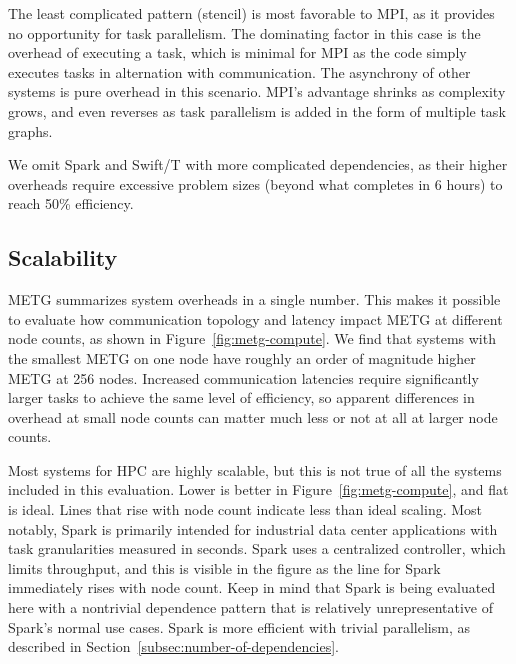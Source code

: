 The least complicated pattern (stencil) is most favorable
to MPI, as it provides no
opportunity for task parallelism. The
dominating factor in this case is the overhead of executing a task, which is
minimal for MPI as the code simply executes tasks in alternation with
communication. The asynchrony
of other systems is pure overhead in this scenario.
MPI's advantage shrinks as complexity grows, and even reverses as task parallelism is
added in the form of multiple task graphs.

We omit Spark and Swift/T
with more complicated dependencies, as their higher overheads require
excessive problem sizes (beyond what completes in 6
hours) to reach 50\% efficiency.

\subsection{Scalability}
\label{subsec:scalability}

METG summarizes system overheads in a single number. This makes it possible to
evaluate how communication topology and latency impact METG at
different node counts, as shown in Figure~\ref{fig:metg-compute}.
We find that
systems with the smallest METG on one node have roughly an order
of magnitude higher METG at 256 nodes. Increased communication latencies require significantly larger tasks to
achieve the same level of efficiency, so apparent differences in
overhead at small node counts can matter much less or not at
all at larger node counts.

Most systems for HPC are highly scalable,
but this is not true of all the systems included in this
evaluation. Lower is better in Figure~\ref{fig:metg-compute}, and
flat is ideal. Lines that rise with node count indicate less than
ideal scaling. Most notably, Spark is primarily
intended for industrial data center applications with task
granularities measured in seconds. Spark uses a centralized
controller, which limits throughput, and this is visible in the figure
as the line for Spark immediately rises with node count. Keep in mind
that Spark is being evaluated here with a nontrivial dependence
pattern that is relatively unrepresentative of Spark's normal use
cases. Spark is more efficient with trivial parallelism, as described
in Section~\ref{subsec:number-of-dependencies}.



